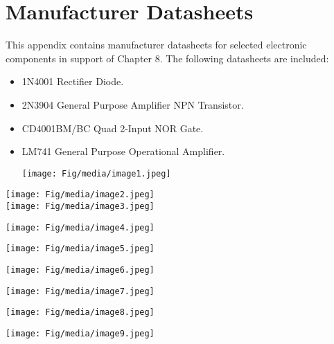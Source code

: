 \section{\texorpdfstring{Manufacturer Datasheets
}{Manufacturer Datasheets }}\label{manufacturer-datasheets}

This appendix contains manufacturer datasheets for selected electronic
components in support of Chapter 8. The following datasheets are
included:

\begin{itemize}
\item
  1N4001 Rectifier Diode.
\item
  2N3904 General Purpose Amplifier NPN Transistor.
\item
  CD4001BM/BC Quad 2-Input NOR Gate.
\item
  LM741 General Purpose Operational Amplifier.

  \texttt{[image: Fig/media/image1.jpeg]}
\end{itemize}

\texttt{[image: Fig/media/image2.jpeg]}\\
\texttt{[image: Fig/media/image3.jpeg]}

\texttt{[image: Fig/media/image4.jpeg]}

\texttt{[image: Fig/media/image5.jpeg]}

\texttt{[image: Fig/media/image6.jpeg]}

\texttt{[image: Fig/media/image7.jpeg]}

\texttt{[image: Fig/media/image8.jpeg]}

\texttt{[image: Fig/media/image9.jpeg]}
